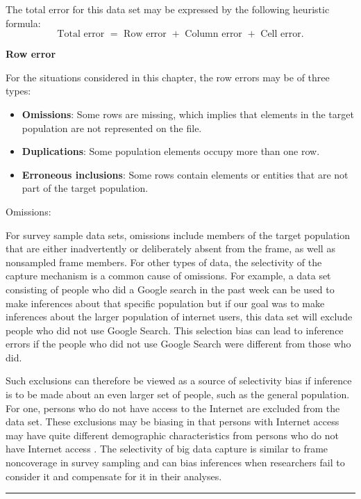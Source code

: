 \documentclass[]{krantz}
\begin{document}
The total error for this data set may be expressed by the following
heuristic formula:
\[\text{Total error } =\text{ Row error } + \text{ Column error }
+ \text{ Cell error}.\]

\textbf{Row error}

For the situations considered in this chapter, the row errors may be of
three types:

\begin{itemize}
\item
  \textbf{Omissions}: Some rows are missing, which implies that elements
  in the target population are not represented on the file.
\item
  \textbf{Duplications}: Some population elements occupy more than one
  row.
\item
  \textbf{Erroneous inclusions}: Some rows contain elements or entities
  that are not part of the target population.
\end{itemize}

Omissions:

For survey sample data sets, omissions include members of the target
population that are either inadvertently or deliberately absent from the
frame, as well as nonsampled frame members. For other types of data, the
selectivity of the capture mechanism is a common cause of omissions. For
example, a data set consisting of people who did a Google search in the
past week can be used to make inferences about that specific population
but if our goal was to make inferences about the larger population of
internet users, this data set will exclude people who did not use Google
Search. This selection bias can lead to inference errors if the people
who did not use Google Search were different from those who did.

Such exclusions can therefore be viewed as a source of selectivity bias
if inference is to be made about an even larger set of people, such as
the general population. For one, persons who do not have access to the
Internet are excluded from the data set. These exclusions may be biasing
in that persons with Internet access may have quite different
demographic characteristics from persons who do not have Internet access
\citep{dutwinbuskirk2017}. The selectivity of big data capture is
similar to frame noncoverage in survey sampling and can bias inferences
when researchers fail to consider it and compensate for it in their
analyses.

\begin{center}\rule{0.5\linewidth}{\linethickness}\end{center}
\end{document}
